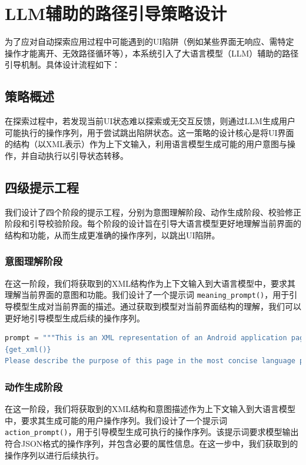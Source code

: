 \documentclass[UTF8, fontset=windows]{article}
\begin{document}
\section{LLM辅助的路径引导策略设计}

为了应对自动探索应用过程中可能遇到的UI陷阱（例如某些界面无响应、需特定操作才能离开、无效路径循环等），本系统引入了大语言模型（LLM）辅助的路径引导机制。具体设计流程如下：

\subsection{策略概述}
在探索过程中，若发现当前UI状态难以探索或无交互反馈，则通过LLM生成用户可能执行的操作序列，用于尝试跳出陷阱状态。这一策略的设计核心是将UI界面的结构（以XML表示）作为上下文输入，利用语言模型生成可能的用户意图与操作，并自动执行以引导状态转移。

\subsection{四级提示工程}


我们设计了四个阶段的提示工程，分别为意图理解阶段、动作生成阶段、校验修正阶段和引导校验阶段。每个阶段的设计旨在引导大语言模型更好地理解当前界面的结构和功能，从而生成更准确的操作序列，以跳出UI陷阱。

\subsubsection{意图理解阶段} 

在这一阶段，我们将获取到的XML结构作为上下文输入到大语言模型中，要求其理解当前界面的意图和功能。我们设计了一个提示词 \texttt{meaning\_prompt()}，用于引导模型生成对当前界面的描述。通过获取到模型对当前界面结构的理解，我们可以更好地引导模型生成后续的操作序列。
\begin{lstlisting}[language=Python]
prompt = """This is an XML representation of an Android application page:
{get_xml()}
Please describe the purpose of this page in the most concise language possible."""
\end{lstlisting}

\subsubsection{动作生成阶段} 

在这一阶段，我们将获取到的XML结构和意图描述作为上下文输入到大语言模型中，要求其生成可能的用户操作序列。我们设计了一个提示词 \texttt{action\_prompt()}，用于引导模型生成可执行的操作序列。该提示词要求模型输出符合JSON格式的操作序列，并包含必要的属性信息。在这一步中，我们获取到的操作序列以进行后续执行。
\end{document}
